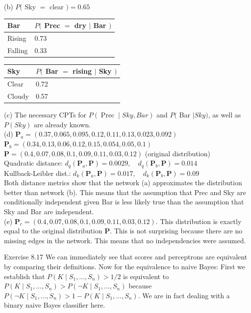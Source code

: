 \documentclass[10pt]{book}
\begin{document}
(b) $P($ Sky $=$ clear $)=0.65$

\begin{center}
\begin{tabular}{ll}
\hline
Bar & $P($ Prec $=$ dry $\mid$ Bar $)$ \\
\hline
Rising & 0.73 \\
\hline
Falling & 0.33 \\
\hline
\end{tabular}
\end{center}

\begin{center}
\begin{tabular}{ll}
\hline
Sky & $P($ Bar $=$ rising $\mid$ Sky $)$ \\
\hline
Clear & 0.72 \\
\hline
Cloudy & 0.57 \\
\hline
\end{tabular}
\end{center}

(c) The necessary CPTs for $P(\operatorname{Prec} \mid S k y, B a r)$ and $P($ Bar $\mid S k y)$, as well as $P(S k y)$ are already known.\\
(d) $\boldsymbol{P}_{a}=(0.37,0.065,0.095,0.12,0.11,0.13,0.023,0.092)$\\
$\boldsymbol{P}_{b}=(0.34,0.13,0.06,0.12,0.15,0.054,0.05,0.1)$\\
$\boldsymbol{P}=(0.4,0.07,0.08,0.1,0.09,0.11,0.03,0.12)$ (original distribution)\\
Quadratic distance: $d_{q}\left(\boldsymbol{P}_{a}, \boldsymbol{P}\right)=0.0029, \quad d_{q}\left(\boldsymbol{P}_{b}, \boldsymbol{P}\right)=0.014$\\
Kullback-Leibler dist.: $d_{k}\left(\boldsymbol{P}_{a}, \boldsymbol{P}\right)=0.017, \quad d_{k}\left(\boldsymbol{P}_{b}, \boldsymbol{P}\right)=0.09$\\
Both distance metrics show that the network (a) approximates the distribution better than network (b). This means that the assumption that Prec and Sky are conditionally independent given Bar is less likely true than the assumption that Sky and Bar are independent.\\
(e) $\boldsymbol{P}_{c}=(0.4,0.07,0.08,0.1,0.09,0.11,0.03,0.12)$. This distribution is exactly equal to the original distribution $\boldsymbol{P}$. This is not surprising because there are no missing edges in the network. This means that no independencies were assumed.

Exercise 8.17 We can immediately see that scores and perceptrons are equivalent by comparing their definitions. Now for the equivalence to naive Bayes: First we establish that $P\left(K \mid S_{1}, \ldots, S_{n}\right)>1 / 2$ is equivalent to $P\left(K \mid S_{1}, \ldots, S_{n}\right)> P\left(\neg K \mid S_{1}, \ldots, S_{n}\right)$ because $P\left(\neg K \mid S_{1}, \ldots, S_{n}\right)>1-P\left(K \mid S_{1}, \ldots, S_{n}\right)$. We are in fact dealing with a binary naive Bayes classifier here.
\end{document}
